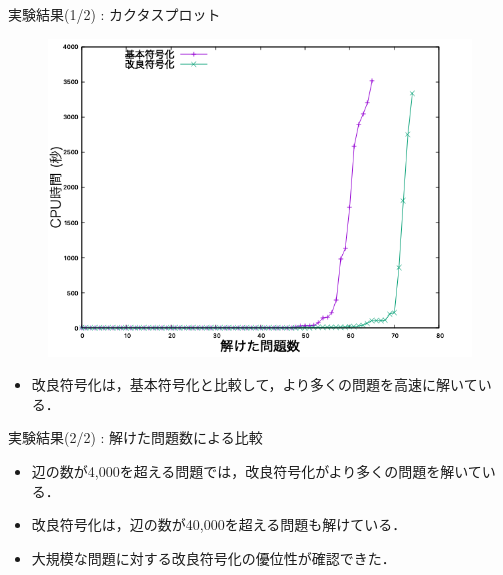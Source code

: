 \begin{frame}{実験結果(1/2) : カクタスプロット}
 \begin{figure}[h]
  \centering
  \includegraphics[scale=0.38]{fig/cactus.png}
 \end{figure}\vfill

\begin{itemize}
 \item 改良符号化は，基本符号化と比較して，より多くの問題を高速に解いている．
\end{itemize}
\end{frame}

\begin{frame}{実験結果(2/2) : 解けた問題数による比較}

\begin{table}[t]
 \centering
 
\end{table}\vfill

\begin{itemize}
\item 辺の数が4,000を超える問題では，改良符号化がより多くの問題を解いている．
\item 改良符号化は，辺の数が40,000を超える問題も解けている．
\item 大規模な問題に対する改良符号化の優位性が確認できた．
\end{itemize}
\end{frame}

